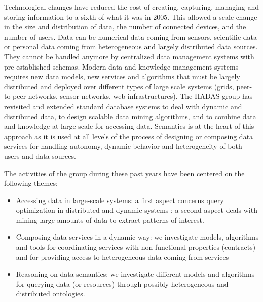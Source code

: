Technological changes have reduced the cost of creating, capturing, managing and storing information to a sixth of what it was in 2005. This allowed a scale change in the size and distribution of data, the number of connected devices, and the number of users. 
Data can be numerical data coming from sensors, scientific data or personal data coming from heterogeneous and largely distributed data sources. 
They cannot be handled anymore by centralized data management systems with pre-established schemas. Modern data and knowledge management systems requires new data models, new services and algorithms that must be largely distributed and deployed over different types of large scale systems (grids, peer-to-peer networks, sensor networks, web infrastructures). 
The HADAS group has revisited and extended standard database systems to deal with dynamic and distributed data, to design scalable data mining algorithms, and to combine data and knowledge at large scale for accessing data. Semantics is at the heart of this approach as it is used at all levels of the process of designing or composing data services for handling autonomy, dynamic behavior and heterogeneity of both users and data sources. 

The activities of the group during these past years have been centered on the following themes:
\begin{itemize}
\item  Accessing data in large-scale systems: a first aspect concerns query optimization in distributed and dynamic systems ; a second aspect deals with mining large amounts of data to extract patterns of interest.
\item  Composing data services in a dynamic way:  we investigate models, algorithms and tools for coordinating services with non functional properties (contracts) and for providing access to heterogeneous data coming from services
\item  Reasoning on data semantics: we investigate different models and  algorithms  for querying data (or resources) through  possibly heterogeneous and distributed ontologies.
\end{itemize}

